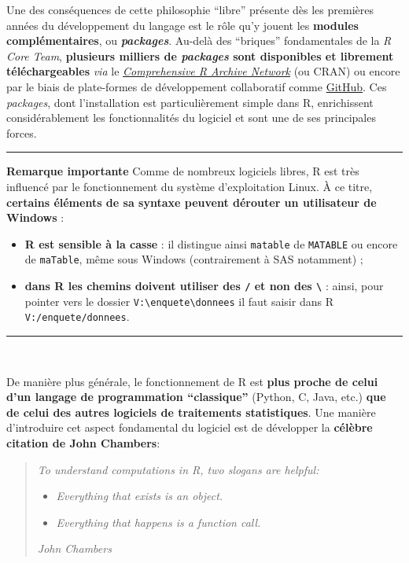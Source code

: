 \documentclass[12pt,twosided, notitlepage]{book}
\providecommand{\tightlist}{%
  \setlength{\itemsep}{0pt}\setlength{\parskip}{0pt}}
\begin{document}
Une des conséquences de cette philosophie \enquote{libre} présente dès
les premières années du développement du langage est le rôle qu'y jouent
les \textbf{modules complémentaires}, ou \textbf{\emph{packages}}.
Au-delà des \enquote{briques} fondamentales de la \emph{R Core Team},
\textbf{plusieurs milliers de \emph{packages} sont disponibles et
librement téléchargeables} \emph{via} le
\href{https://cran.r-project.org/}{\emph{Comprehensive R Archive
Network}} (ou CRAN) ou encore par le biais de plate-formes de
développement collaboratif comme \href{https://github.com/}{GitHub}. Ces
\emph{packages}, dont l'installation est particulièrement simple dans R,
enrichissent considérablement les fonctionnalités du logiciel et sont
une de ses principales forces.

\begin{center}\rule{0.5\linewidth}{\linethickness}\end{center}

\textbf{Remarque importante} Comme de nombreux logiciels libres, R est
très influencé par le fonctionnement du système d'exploitation Linux. À
ce titre, \textbf{certains éléments de sa syntaxe peuvent dérouter un
utilisateur de Windows} :

\begin{itemize}
\tightlist
\item
  \textbf{R est sensible à la casse} : il distingue ainsi
  \texttt{matable} de \texttt{MATABLE} ou encore de \texttt{maTable},
  même sous Windows (contrairement à SAS notamment) ;
\item
  \textbf{dans R les chemins doivent utiliser des \texttt{/} et non des
  \texttt{\textbackslash{}}} : ainsi, pour pointer vers le dossier
  \texttt{V:\textbackslash{}enquete\textbackslash{}donnees} il faut
  saisir dans R \texttt{V:/enquete/donnees}.
\end{itemize}

\begin{center}\rule{0.5\linewidth}{\linethickness}\end{center}

~

De manière plus générale, le fonctionnement de R est \textbf{plus proche
de celui d'un langage de programmation \enquote{classique}} (Python, C,
Java, etc.) \textbf{que de celui des autres logiciels de traitements
statistiques}. Une manière d'introduire cet aspect fondamental du
logiciel est de développer la \textbf{célèbre citation de John
Chambers}:

\begin{quote}
\emph{To understand computations in R, two slogans are helpful:}

\begin{itemize}
\item
  \emph{Everything that exists is an object.}
\item
  \emph{Everything that happens is a function call.}
\end{itemize}

\emph{John Chambers}
\end{quote}
\end{document}
